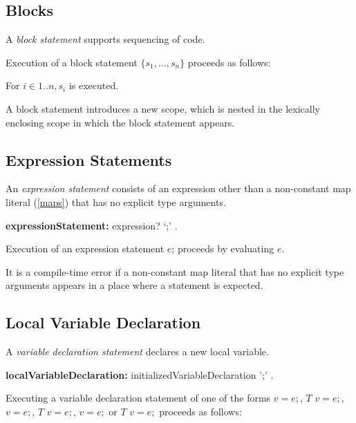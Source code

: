 \documentclass{article}
\newcommand{\code}[1]{{\sf #1}}
\begin{document}
\begin{itemize}
 \subsection{Blocks}

\LMHash{}
 A {\em block statement} supports sequencing of code.

\LMHash{}
Execution of a block statement $\{s_1, \ldots,  s_n\}$ proceeds as follows:

\LMHash{}
For $i \in 1 .. n, s_i$ is executed.

\LMHash{}
A block statement introduces a new scope, which is nested in the lexically enclosing scope in which the block statement appears.



 \subsection{Expression Statements}

\LMHash{}
An {\em expression statement} consists of an expression other than a non-constant map literal (\ref{maps}) that has no explicit type arguments.


 \begin{grammar}
{\bf expressionStatement:}
  expression? `{\escapegrammar ;}'
  .
 \end{grammar}

\LMHash{}
Execution of an expression statement \code{$e$;} proceeds by evaluating $e$.

\LMHash{}
It is a compile-time error if a non-constant map literal that has no explicit type arguments appears in a place where a statement is expected.

\subsection{Local Variable Declaration}


\LMHash{}
A {\em variable declaration statement }declares a new local variable.

 \begin{grammar}
{\bf localVariableDeclaration:}
    initializedVariableDeclaration {\escapegrammar';'}
  .
 \end{grammar}

\LMHash{}
 Executing a variable declaration statement of one of the forms  \VAR{} $v = e;$, $T$ $v = e; $, \CONST{}  $v = e;$, \CONST{} $T$ $v = e;$, \FINAL{}  $v = e;$ or \FINAL{} $T$ $v = e;$ proceeds as follows:


\end{itemize}
\end{document}
